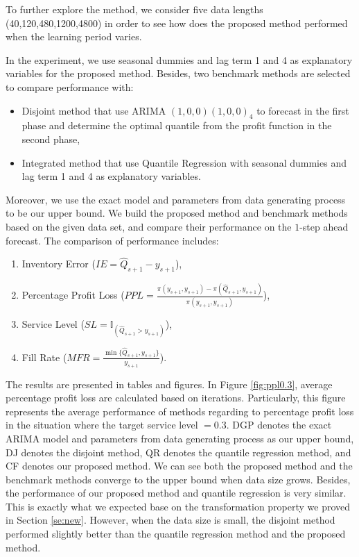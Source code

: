 \documentclass{article}
\begin{document}
To further explore the method, we consider five data lengths (40,120,480,1200,4800) in order to see how does the proposed method performed when the learning period varies.

In the experiment, we use seasonal dummies and lag term 1 and 4 as explanatory variables for the proposed method. Besides, two benchmark methods are selected to compare performance with:
\begin{itemize}
    \item Disjoint method that use ARIMA $(1,0,0)(1,0,0)_4$ to forecast in the first phase and determine the optimal quantile from the profit function in the second phase,
    \item Integrated method that use Quantile Regression with seasonal dummies and lag term 1 and 4 as explanatory variables.
\end{itemize}
Moreover, we use the exact model and parameters from data generating process to be our upper bound. We build the proposed method and benchmark methods based on the given data set, and compare their performance on the $1$-step ahead forecast. The comparison of performance includes:
\begin{enumerate}
    \item Inventory Error  ($IE=\hat{Q}_{s+1}-y_{s+1}$),
    \item Percentage Profit Loss ($PPL=\frac{\pi(y_{s+1},y_{s+1})-\pi(\hat{Q}_{s+1},y_{s+1})}{\pi(y_{s+1},y_{s+1})}$),
    \item Service Level ($SL=\mathbb {I}_{(\hat{Q}_{s+1}>y_{s+1})}$),
    \item Fill Rate ($MFR=\frac{\min\{\hat{Q}_{s+1},y_{s+1}\}}{y_{s+1}}$).
\end{enumerate}

The results are presented in tables and figures. In Figure \ref{fig:ppl0.3}, average percentage profit loss are calculated based on iterations. Particularly, this figure represents the average performance of methods regarding to percentage profit loss in the situation where the target service level $=0.3$. DGP denotes the exact ARIMA model and parameters from data generating process as our upper bound, DJ denotes the disjoint method, QR denotes the quantile regression method, and CF denotes our proposed method. We can see both the proposed method and the benchmark methods converge to the upper bound when data size grows. Besides, the performance of our proposed method and quantile regression is very similar. This is exactly what we expected base on the transformation property we proved in Section \ref{se:new}. However, when the data size is small, the disjoint method performed slightly better than the quantile regression method and the proposed method. 
\end{document}
